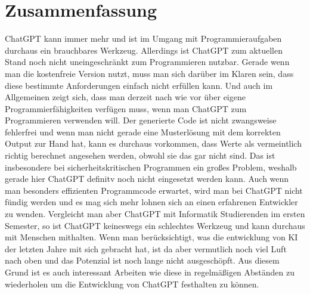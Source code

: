 \documentclass[class=scrbook, crop=false]{standalone}
\begin{document}
\chapter{Zusammenfassung}
\label{ch:zusammenfassung}
    ChatGPT kann immer mehr und ist im Umgang mit Programmieraufgaben durchaus ein brauchbares Werkzeug.
    Allerdings ist ChatGPT zum aktuellen Stand noch nicht uneingeschränkt zum Programmieren nutzbar.
    Gerade wenn man die kostenfreie Version nutzt, muss man sich darüber im Klaren sein, dass diese bestimmte Anforderungen einfach nicht erfüllen kann.
    Und auch im Allgemeinen zeigt sich, dass man derzeit nach wie vor über eigene Programmierfähigkeiten verfügen muss,
    wenn man ChatGPT zum Programmieren verwenden will.
    Der generierte Code ist nicht zwangsweise fehlerfrei und wenn man nicht gerade eine Musterlösung mit dem korrekten
    Output zur Hand hat, kann es durchaus vorkommen, dass Werte als vermeintlich richtig berechnet angesehen werden,
    obwohl sie das gar nicht sind.
    Das ist insbesondere bei sicherheitskritischen Programmen ein großes Problem, weshalb gerade hier ChatGPT definitv
    noch nicht eingesetzt werden kann.
    Auch wenn man besonders effizienten Programmcode erwartet, wird man bei ChatGPT nicht fündig werden und es mag sich
    mehr lohnen sich an einen erfahrenen Entwickler zu wenden.
    Vergleicht man aber ChatGPT mit Informatik Studierenden im ersten Semester, so ist ChatGPT keineswegs ein schlechtes Werkzeug
    und kann durchaus mit Menschen mithalten.
    Wenn man berücksichtigt, was die entwicklung von KI der letzten Jahre mit sich gebracht hat, ist da aber vermutlich
    noch viel Luft nach oben und das Potenzial ist noch lange nicht ausgeschöpft.
    Aus diesem Grund ist es auch interessant Arbeiten wie diese in regelmäßigen Abständen zu wiederholen um die
    Entwicklung von ChatGPT festhalten zu können.
\end{document}
